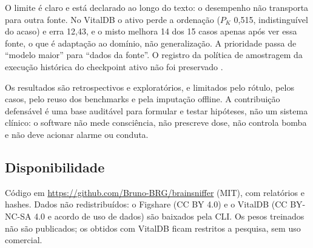 \documentclass[12pt]{article}
\begin{document}
O limite é claro e está declarado ao longo do texto: o desempenho não transporta para outra fonte. No VitalDB o ativo perde a ordenação ($P_K$ 0,515, indistinguível do acaso) e erra 12,43, e o misto melhora 14 dos 15 casos apenas após ver essa fonte, o que é adaptação ao domínio, não generalização. A prioridade passa de ``modelo maior'' para ``dados da fonte''. O registro da política de amostragem da execução histórica do checkpoint ativo não foi preservado \cite{tripodai}.

Os resultados são retrospectivos e exploratórios, e limitados pelo rótulo, pelos casos, pelo reuso dos benchmarks e pela imputação offline. A contribuição defensável é uma base auditável para formular e testar hipóteses, não um sistema clínico: o software não mede consciência, não prescreve dose, não controla bomba e não deve acionar alarme ou conduta.

\subsection*{Disponibilidade}
Código em \url{https://github.com/Bruno-BRG/brainsniffer} (MIT), com relatórios e hashes. Dados não redistribuídos: o Figshare (CC BY 4.0) e o VitalDB (CC BY-NC-SA 4.0 e acordo de uso de dados) são baixados pela CLI. Os pesos treinados não são publicados; os obtidos com VitalDB ficam restritos a pesquisa, sem uso comercial.

\begin{small}


\end{small}
\end{document}
